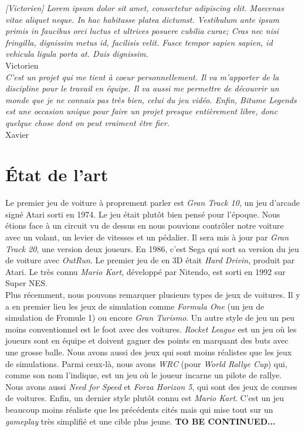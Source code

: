 \documentclass[11pt,a4paper]{article}
\begin{document}
  \textit{[Victorien] Lorem ipsum dolor sit amet, consectetur adipiscing elit. Maecenas vitae aliquet neque. In hac habitasse platea dictumst. Vestibulum ante ipsum primis in faucibus orci luctus et ultrices posuere cubilia curae; Cras nec nisi fringilla, dignissim metus id, facilisis velit. Fusce tempor sapien sapien, id vehicula ligula porta at. Duis dignissim.}\\
  \indent Victorien\\

  \textit{C'est un projet qui me tient à coeur personnellement. Il va m'apporter de la discipline pour le travail
    en équipe. Il va aussi me permettre de découvrir un monde que je ne connais pas très bien, celui du jeu vidéo.
    Enfin, Bitume Legends est une occasion unique pour faire un projet presque entièrement libre, donc quelque
    chose dont on peut vraiment être fier.}\\
  \indent Xavier
\clearpage

\section{État de l'art}
  Le premier jeu de voiture à proprement parler est \textit{Gran Track 10}, un jeu d'arcade signé Atari 
  sorti en 1974. Le jeu était plutôt bien pensé pour l'époque. Nous étions face à un 
  circuit vu de dessus en nous pouvions contrôler notre voiture avec un volant, un levier de vitesses
  et un pédalier. Il sera mis à jour par \textit{Gran Track 20}, une version deux joueurs.
  En 1986, c'est Sega qui sort sa version du jeu de voiture avec \textit{OutRun}. Le premier 
  jeu de en 3D était \textit{Hard Drivin}, produit par Atari. Le très connu \textit{Mario Kart},
  développé par Nitendo, est sorti en 1992 sur Super NES.\\
  \indent Plus récemment, nous pouvons remarquer plusieurs types de jeux de voitures. Il y a en premier lieu 
  les jeux de simulation comme \textit{Formula One} (un jeu de simulation de Fromule 1) ou encore 
  \textit{Gran Turismo}. Un autre style de jeu un peu moins conventionnel est le foot avec des voitures. 
  \textit{Rocket League} est un jeu où les joueurs sont en équipe  et doivent gagner des
  points en marquant des buts avec une grosse balle. Nous avons aussi des jeux qui sont moins réalistes
  que les jeux de simulations. Parmi ceux-là, nous avons \textit{WRC} (pour \textit{World Rallye Cup})
  qui, comme son nom l'indique, est un jeu où le joueur incarne un pilote de rallye. Nous avons aussi 
  \textit{Need for Speed} et \textit{Forza Horizon 5}, qui sont des jeux de courses de voitures.
  Enfin, un dernier style plutôt connu est \textit{Mario Kart}. C'est un jeu beaucoup moins réaliste
  que les précédents cités mais qui mise tout sur un \textit{gameplay} très simplifié et une cible plus
  jeune.
  \textbf{TO BE CONTINUED...}
\clearpage
\end{document}
